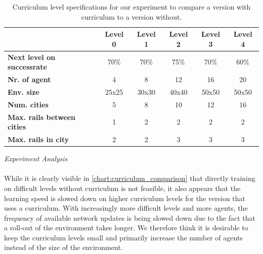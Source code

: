 \begin{table}
	\centering
	\begin{tabular}{ |l|c|c|c|c|c| } 
		\hline
		& \textbf{Level 0} 
		& \textbf{Level 1}  
		& \textbf{Level 2} 
		& \textbf{Level 3} 
		& \textbf{Level 4}\\
		\hline
		\textbf{Next level on successrate} & 70\% & 70\% & 75\% & 70\% & 60\% \\  
		\textbf{Nr. of agent} & 4 & 8 & 12 & 16 & 20 \\  
		\textbf{Env. size} & 25x25 & 30x30  & 40x40 & 50x50 & 50x50 \\ 
		\textbf{Num. cities} & 5 & 8 & 10  & 12 & 16 \\ 
		\textbf{Max. rails between cities} & 1 & 2 & 2 & 2 & 2  \\ 
		\textbf{Max. rails in city} & 2 & 2 & 3 & 3 & 3  \\ 
		\hline
	\end{tabular}
	\label{table:curriculum_data}
	\caption{Curriculum level specifications for our experiment to compare a version with curriculum to a version without.}
\end{table}
\textit{Experiment Analysis}\\\\
While it is clearly visible in \autoref{chart:curriculum_comparison} that directly training on difficult levels without curriculum is not feasible, it also appears that the learning speed is slowed down on higher curriculum levels for the version that uses a curriculum. With increasingly more difficult levels and more agents, the frequency of available network updates is being slowed down due to the fact that a roll-out of the environment takes longer. We therefore think it is desirable to keep the curriculum levels small and primarily increase the number of agents instead of the size of the environment.


